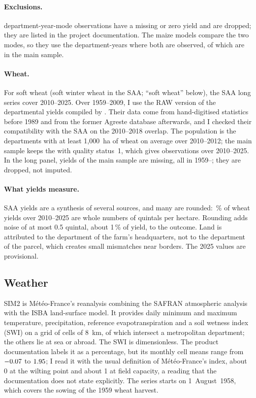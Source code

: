 \paragraph{Exclusions.} \MaizeRemoved{} department-year-mode observations have a missing or zero yield and are dropped; they are listed in the project documentation. The maize models compare the two modes, so they use the \MaizePairs{} department-years where both are observed, of which \MaizeMainPairs{} are in the main sample.

\paragraph{Wheat.} For soft wheat (soft winter wheat in the SAA; ``soft wheat'' below), the SAA long series cover 2010--2025. Over 1959--2009, I use the RAW version of the departmental yields compiled by \textcite{schauberger2022}. Their data come from hand-digitised statistics before 1989 and from the former Agreste database afterwards, and I checked their compatibility with the SAA on the 2010--2018 overlap. The population is the \WheatDeps{} departments with at least 1,000~ha of wheat on average over 2010--2012; the main sample keeps the \WheatMainDeps{} with quality status~1, which gives \WheatMainObs{} observations over 2010--2025. In the long panel, \WheatLongMissing{} yields of the main sample are missing, all in 1959--\WheatLongMissingLast; they are dropped, not imputed.

\paragraph{What yields measure.} SAA yields are a synthesis of several sources, and many are rounded: \WheatIntegerShare\,\% of wheat yields over 2010--2025 are whole numbers of quintals per hectare. Rounding adds noise of at most 0.5 quintal, about 1\,\% of yield, to the outcome. Land is attributed to the department of the farm's headquarters, not to the department of the parcel, which creates small mismatches near borders. The 2025 values are provisional.

\subsection{Weather}

SIM2 is Météo-France's reanalysis combining the SAFRAN atmospheric analysis with the ISBA land-surface model. It provides daily minimum and maximum temperature, precipitation, reference evapotranspiration and a soil wetness index (SWI) on a grid of \SimCells{} cells of 8~km, of which \SimCellsFrance{} intersect a metropolitan department; the others lie at sea or abroad. The SWI is dimensionless. The product documentation labels it as a percentage, but its monthly cell means range from $-0.07$ to $1.95$; I read it with the usual definition of Météo-France's index, about 0 at the wilting point and about 1 at field capacity, a reading that the documentation does not state explicitly. The series starts on 1~August~1958, which covers the sowing of the 1959 wheat harvest.

